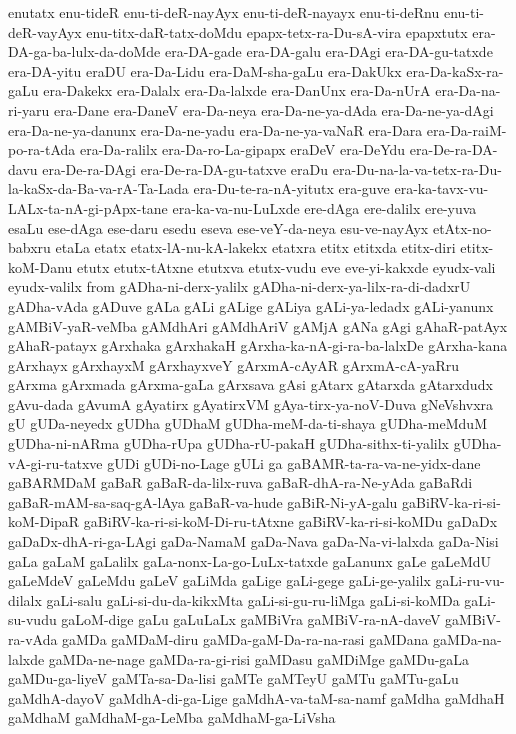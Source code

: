{enutatx
enu-tideR
enu-ti-deR-nayAyx
enu-ti-deR-nayayx
enu-ti-deRnu
enu-ti-deR-vayAyx
enu-titx-daR-tatx-doMdu
epapx-tetx-ra-Du-sA-vira
epapxtutx
era-DA-ga-ba-lulx-da-doMde
era-DA-gade
era-DA-galu
era-DAgi
era-DA-gu-tatxde
era-DA-yitu
eraDU
era-Da-Lidu
era-DaM-sha-gaLu
era-DakUkx
era-Da-kaSx-ra-gaLu
era-Dakekx
era-Dalalx
era-Da-lalxde
era-DanUnx
era-Da-nUrA
era-Da-na-ri-yaru
era-Dane
era-DaneV
era-Da-neya
era-Da-ne-ya-dAda
era-Da-ne-ya-dAgi
era-Da-ne-ya-danunx
era-Da-ne-yadu
era-Da-ne-ya-vaNaR
era-Dara
era-Da-raiM-po-ra-tAda
era-Da-ralilx
era-Da-ro-La-gipapx
eraDeV
era-DeYdu
era-De-ra-DA-davu
era-De-ra-DAgi
era-De-ra-DA-gu-tatxve
eraDu
era-Du-na-la-va-tetx-ra-Du-la-kaSx-da-Ba-va-rA-Ta-Lada
era-Du-te-ra-nA-yitutx
era-guve
era-ka-tavx-vu-LALx-ta-nA-gi-pApx-tane
era-ka-va-nu-LuLxde
ere-dAga
ere-dalilx
ere-yuva
esaLu
ese-dAga
ese-daru
esedu
eseva
ese-veY-da-neya
esu-ve-nayAyx
etAtx-no-babxru
etaLa
etatx
etatx-lA-nu-kA-lakekx
etatxra
etitx
etitxda
etitx-diri
etitx-koM-Danu
etutx
etutx-tAtxne
etutxva
etutx-vudu
eve
eve-yi-kakxde
eyudx-vali
eyudx-valilx
from
gADha-ni-derx-yalilx
gADha-ni-derx-ya-lilx-ra-di-dadxrU
gADha-vAda
gADuve
gALa
gALi
gALige
gALiya
gALi-ya-ledadx
gALi-yanunx
gAMBiV-yaR-veMba
gAMdhAri
gAMdhAriV
gAMjA
gANa
gAgi
gAhaR-patAyx
gAhaR-patayx
gArxhaka
gArxhakaH
gArxha-ka-nA-gi-ra-ba-lalxDe
gArxha-kana
gArxhayx
gArxhayxM
gArxhayxveY
gArxmA-cAyAR
gArxmA-cA-yaRru
gArxma
gArxmada
gArxma-gaLa
gArxsava
gAsi
gAtarx
gAtarxda
gAtarxdudx
gAvu-dada
gAvumA
gAyatirx
gAyatirxVM
gAya-tirx-ya-noV-Duva
gNeVshvxra
gU
gUDa-neyedx
gUDha
gUDhaM
gUDha-meM-da-ti-shaya
gUDha-meMduM
gUDha-ni-nARma
gUDha-rUpa
gUDha-rU-pakaH
gUDha-sithx-ti-yalilx
gUDha-vA-gi-ru-tatxve
gUDi
gUDi-no-Lage
gULi
ga
gaBAMR-ta-ra-va-ne-yidx-dane
gaBARMDaM
gaBaR
gaBaR-da-lilx-ruva
gaBaR-dhA-ra-Ne-yAda
gaBaRdi
gaBaR-mAM-sa-saq-gA-lAya
gaBaR-va-hude
gaBiR-Ni-yA-galu
gaBiRV-ka-ri-si-koM-DipaR
gaBiRV-ka-ri-si-koM-Di-ru-tAtxne
gaBiRV-ka-ri-si-koMDu
gaDaDx
gaDaDx-dhA-ri-ga-LAgi
gaDa-NamaM
gaDa-Nava
gaDa-Na-vi-lalxda
gaDa-Nisi
gaLa
gaLaM
gaLalilx
gaLa-nonx-La-go-LuLx-tatxde
gaLanunx
gaLe
gaLeMdU
gaLeMdeV
gaLeMdu
gaLeV
gaLiMda
gaLige
gaLi-gege
gaLi-ge-yalilx
gaLi-ru-vu-dilalx
gaLi-salu
gaLi-si-du-da-kikxMta
gaLi-si-gu-ru-liMga
gaLi-si-koMDa
gaLi-su-vudu
gaLoM-dige
gaLu
gaLuLaLx
gaMBiVra
gaMBiV-ra-nA-daveV
gaMBiV-ra-vAda
gaMDa
gaMDaM-diru
gaMDa-gaM-Da-ra-na-rasi
gaMDana
gaMDa-na-lalxde
gaMDa-ne-nage
gaMDa-ra-gi-risi
gaMDasu
gaMDiMge
gaMDu-gaLa
gaMDu-ga-liyeV
gaMTa-sa-Da-lisi
gaMTe
gaMTeyU
gaMTu
gaMTu-gaLu
gaMdhA-dayoV
gaMdhA-di-ga-Lige
gaMdhA-va-taM-sa-namf
gaMdha
gaMdhaH
gaMdhaM
gaMdhaM-ga-LeMba
gaMdhaM-ga-LiVsha
}
